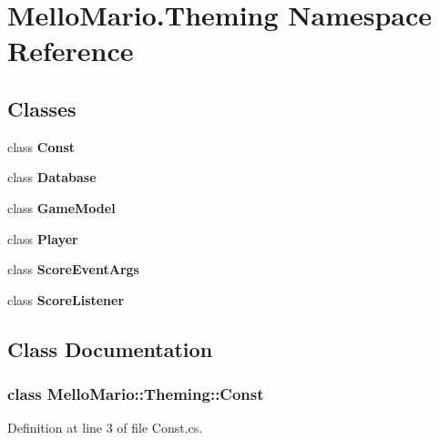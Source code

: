 \section{Mello\+Mario.\+Theming Namespace Reference}
\label{namespaceMelloMario_1_1Theming}
\subsection*{Classes}
\begin{DoxyCompactItemize}
\item 
class \textbf{ Const}
\item 
class \textbf{ Database}
\item 
class \textbf{ Game\+Model}
\item 
class \textbf{ Player}
\item 
class \textbf{ Score\+Event\+Args}
\item 
class \textbf{ Score\+Listener}
\end{DoxyCompactItemize}


\subsection{Class Documentation}
\label{classMelloMario_1_1Theming_1_1Const}
\subsubsection{class Mello\+Mario\+:\+:Theming\+:\+:Const}


Definition at line 3 of file Const.\+cs.



